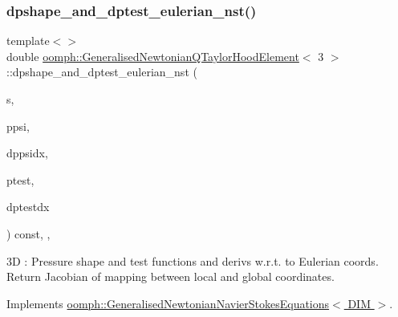 \mbox{\label{classoomph_1_1GeneralisedNewtonianQTaylorHoodElement_adcab5a752161a37601f9019aca18dab8}} 
\subsubsection{\texorpdfstring{dpshape\+\_\+and\+\_\+dptest\+\_\+eulerian\+\_\+nst()}{dpshape\_and\_dptest\_eulerian\_nst()}\hspace{0.1cm}{\footnotesize\ttfamily [3/3]}}
{\footnotesize\ttfamily template$<$$>$ \\
double \hyperlink{classoomph_1_1GeneralisedNewtonianQTaylorHoodElement}{oomph\+::\+Generalised\+Newtonian\+Q\+Taylor\+Hood\+Element}$<$ 3 $>$\+::dpshape\+\_\+and\+\_\+dptest\+\_\+eulerian\+\_\+nst (\begin{DoxyParamCaption}\item[{const \hyperlink{classoomph_1_1Vector}{Vector}$<$ double $>$ \&}]{s,  }\item[{\hyperlink{classoomph_1_1Shape}{Shape} \&}]{ppsi,  }\item[{\hyperlink{classoomph_1_1DShape}{D\+Shape} \&}]{dppsidx,  }\item[{\hyperlink{classoomph_1_1Shape}{Shape} \&}]{ptest,  }\item[{\hyperlink{classoomph_1_1DShape}{D\+Shape} \&}]{dptestdx }\end{DoxyParamCaption}) const\hspace{0.3cm}{\ttfamily [inline]}, {\ttfamily [protected]}, {\ttfamily [virtual]}}

3D \+: Pressure shape and test functions and derivs w.\+r.\+t. to Eulerian coords. Return Jacobian of mapping between local and global coordinates. 

Implements \hyperlink{classoomph_1_1GeneralisedNewtonianNavierStokesEquations_a00027d27dfdf3c0b72b0d1df9addfdc8}{oomph\+::\+Generalised\+Newtonian\+Navier\+Stokes\+Equations$<$ D\+I\+M $>$}.




